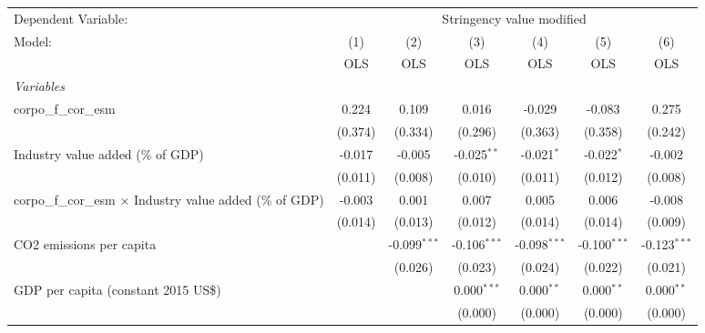 
\begingroup
\centering
\begin{tabular}{lcccccc}
   \toprule
   Dependent Variable: & \multicolumn{6}{c}{Stringency value modified}\\
   Model:                                                            & (1)     & (2)            & (3)            & (4)            & (5)            & (6)\\  
                                                                     &  OLS    & OLS            & OLS            & OLS            & OLS            & OLS\\  
   \midrule
   \emph{Variables}\\
   corpo\_f\_cor\_esm                                                & 0.224   & 0.109          & 0.016          & -0.029         & -0.083         & 0.275\\   
                                                                     & (0.374) & (0.334)        & (0.296)        & (0.363)        & (0.358)        & (0.242)\\   
   Industry value added (\% of GDP)                                  & -0.017  & -0.005         & -0.025$^{**}$  & -0.021$^{*}$   & -0.022$^{*}$   & -0.002\\   
                                                                     & (0.011) & (0.008)        & (0.010)        & (0.011)        & (0.012)        & (0.008)\\   
   corpo\_f\_cor\_esm $\times$ Industry value added (\% of GDP)      & -0.003  & 0.001          & 0.007          & 0.005          & 0.006          & -0.008\\   
                                                                     & (0.014) & (0.013)        & (0.012)        & (0.014)        & (0.014)        & (0.009)\\   
   CO2 emissions per capita                                          &         & -0.099$^{***}$ & -0.106$^{***}$ & -0.098$^{***}$ & -0.100$^{***}$ & -0.123$^{***}$\\   
                                                                     &         & (0.026)        & (0.023)        & (0.024)        & (0.022)        & (0.021)\\   
   GDP per capita (constant 2015 US\$)                               &         &                & 0.000$^{***}$  & 0.000$^{**}$   & 0.000$^{**}$   & 0.000$^{**}$\\   
                                                                     &         &                & (0.000)        & (0.000)        & (0.000)        & (0.000)\\   

\end{tabular}
